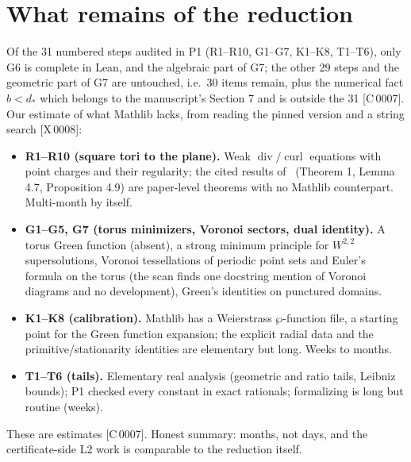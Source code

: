 \documentclass[10pt]{article}
\newcommand{\tg}[2]{\texorpdfstring{\textsf{[#1\,#2]}}{}}  %
\renewcommand{\div}{\operatorname{div}}
\newcommand{\curl}{\operatorname{curl}}
\renewcommand{\_}{\textunderscore\allowbreak}
\begin{document}
\section{What remains of the reduction}\label{sec:reduction}
Of the 31 numbered steps audited in P1 (R1--R10, G1--G7, K1--K8, T1--T6), only G6 is complete in Lean, and the algebraic part of G7; the other 29 steps and the geometric part of G7 are untouched, i.e.\ 30 items remain, plus the numerical fact $b<d_*$ which belongs to the manuscript's Section 7 and is outside the 31 \tg{C}{0007}. Our estimate of what Mathlib lacks, from reading the pinned version and a string search \tg{X}{0008}:
\begin{itemize}
\item \textbf{R1--R10 (square tori to the plane).} Weak $\div/\curl$ equations with point charges and their regularity; the cited results of~\cite{ss} (Theorem 1, Lemma 4.7, Proposition 4.9) are paper-level theorems with no Mathlib counterpart. Multi-month by itself.
\item \textbf{G1--G5, G7 (torus minimizers, Voronoi sectors, dual identity).} A torus Green function (absent), a strong minimum principle for $W^{2,2}$ supersolutions, Voronoi tessellations of periodic point sets and Euler's formula on the torus (the scan finds one docstring mention of Voronoi diagrams and no development), Green's identities on punctured domains.
\item \textbf{K1--K8 (calibration).} Mathlib has a Weierstrass $\wp$-function file, a starting point for the Green function expansion; the explicit radial data and the primitive/stationarity identities are elementary but long. Weeks to months.
\item \textbf{T1--T6 (tails).} Elementary real analysis (geometric and ratio tails, Leibniz bounds); P1 checked every constant in exact rationals; formalizing is long but routine (weeks).
\end{itemize}
These are estimates \tg{C}{0007}. Honest summary: months, not days, and the certificate-side L2 work is comparable to the reduction itself.
\end{document}
